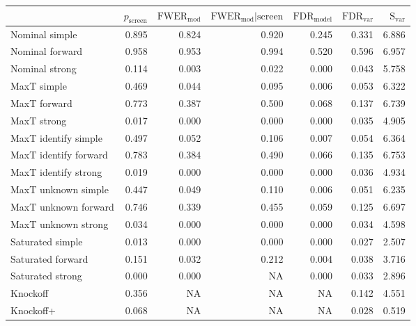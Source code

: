 
\newcommand{\guarantee}[1]{{\color{blue} #1}}
\begin{tabular}{|l|rrrrrr|}
 \hline
{} &  $p_{\text{screen}}$ &  $\text{FWER}_{\text{mod}}$ &  $\text{FWER}_{\text{mod}} \vert \text{screen}$ &  $\text{FDR}_{\text{model}}$ &  $\text{FDR}_{\text{var}}$ &  $\text{S}_{\text{var}}$ \\ \hline
Nominal simple & 0.895 & 0.824 & 0.920 & 0.245 & 0.331 & 6.886 \\ 
Nominal forward & 0.958 & 0.953 & 0.994 & 0.520 & 0.596 & 6.957 \\ 
Nominal strong & 0.114 & 0.003 & 0.022 & 0.000 & 0.043 & 5.758 \\ 
MaxT simple & 0.469 & \guarantee{0.044} & \guarantee{0.095} & \guarantee{0.006} & 0.053 & 6.322 \\ 
MaxT forward & 0.773 & 0.387 & 0.500 & \guarantee{0.068} & 0.137 & 6.739 \\ 
MaxT strong & 0.017 & \guarantee{0.000} & 0.000 & \guarantee{0.000} & 0.035 & 4.905 \\ 
MaxT identify simple & 0.497 & \guarantee{0.052} & \guarantee{0.106} & \guarantee{0.007} & 0.054 & 6.364 \\ 
MaxT identify forward & 0.783 & 0.384 & 0.490 & \guarantee{0.066} & 0.135 & 6.753 \\ 
MaxT identify strong & 0.019 & \guarantee{0.000} & 0.000 & \guarantee{0.000} & 0.036 & 4.934 \\ 
MaxT unknown simple & 0.447 & \guarantee{0.049} & \guarantee{0.110} & \guarantee{0.006} & 0.051 & 6.235 \\ 
MaxT unknown forward & 0.746 & 0.339 & 0.455 & \guarantee{0.059} & 0.125 & 6.697 \\ 
MaxT unknown strong & 0.034 & \guarantee{0.000} & 0.000 & \guarantee{0.000} & 0.034 & 4.598 \\ 
Saturated simple & 0.013 & 0.000 & 0.000 & 0.000 & 0.027 & 2.507 \\ 
Saturated forward & 0.151 & 0.032 & 0.212 & 0.004 & 0.038 & 3.716 \\ 
Saturated strong & 0.000 & 0.000 & NA & 0.000 & 0.033 & 2.896 \\ 
Knockoff & 0.356 & NA & NA & NA & 0.142 & 4.551 \\ 
Knockoff+ & 0.068 & NA & NA & NA & \guarantee{0.028} & 0.519 \\   \hline
\end{tabular}